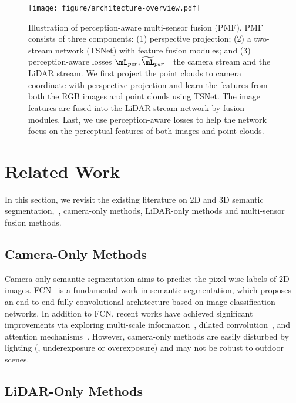 \documentclass[10pt,twocolumn,letterpaper]{article}
\begin{document}
\begin{figure*}
    \centering
    \texttt{[image: figure/architecture-overview.pdf]}
    \caption{Illustration of perception-aware multi-sensor fusion (PMF). PMF consists of three components: (1) perspective projection; (2) a two-stream network (TSNet) with feature fusion modules; and (3) perception-aware losses $\mL_{per},\widetilde{\mL}_{per}$~\wrt~the camera stream and the LiDAR stream. We first project the point clouds to camera coordinate with perspective projection and learn the features from both the RGB images and point clouds using TSNet. The image features are fused into the LiDAR stream network by fusion modules. Last, we use perception-aware losses to help the network focus on the perceptual features of both images and point clouds.}
    \label{fig:arch_overview}
\end{figure*}


\section{Related Work}
In this section, we revisit the existing literature on 2D and 3D semantic segmentation,~\ie, camera-only methods, LiDAR-only methods and multi-sensor fusion methods. 
\subsection{Camera-Only Methods}


Camera-only semantic segmentation aims to predict the pixel-wise labels of 2D images. FCN~\cite{Long2015FullyCN} is a fundamental work in semantic segmentation, which proposes an end-to-end fully convolutional architecture based on image classification networks. In addition to FCN, recent works have achieved significant improvements via exploring multi-scale information~\cite{chen2017deeplab, lin2016efficient, zhao2017pyramid}, dilated convolution~\cite{chen2017rethinking,mehta2018espnet,wang2018understanding}, and attention mechanisms~\cite{huang2019ccnet,yuan2018ocnet}. However, camera-only methods are easily disturbed by lighting (\eg, underexposure or overexposure) and may not be robust to outdoor scenes.

\subsection{LiDAR-Only Methods}
\end{document}
